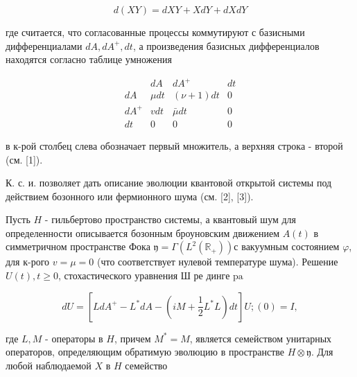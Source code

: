 \documentclass[10pt]{article}
\begin{document}
\[

d(X Y)=d X Y+X d Y+d X d Y

\]



где считается, что согласованные процессы коммутируют с базисными дифференциалами $d A, d A^{+}, d t$, а произведения базисных дифференциалов находятся согласно таблице умножения



\[

\begin{array}{r|ccc} 

& d A & d A^{+} & d t \\

\hline d A & \mu d t & (\nu+1) d t & 0 \\

d A^{+} & v d t & \bar{\mu} d t & 0 \\

d t & 0 & 0 & 0

\end{array}

\]



в к-рой столбец слева обозначает первый множитель, а верхняя строка - второй (см. [1]).



К. с. и. позволяет дать описание эволюции квантовой открытой системы под действием бозонного или фермионного шума (см. [2], [3]).



Пусть $H$ - гильбертово пространство системы, а квантовый шум для определенности описывается бозонным броуновским движением $A(t)$ в симметричном пространстве Фока $\mathfrak{y}=\Gamma\left(L^{2}\left(\mathbb{R}_{+}\right)\right)$с вакуумным состоянием $\varphi$, для к-рого $v=\mu=0$ (что соответствует нулевой температуре шума). Решение $U(t), t \geqslant 0$, стохастического уравнения Ш ре динге $\mathrm{pa}$



\[

d U=\left[L d A^{+}-L^{*} d A-\left(i M+\frac{1}{2} L^{*} L\right) d t\right] U ;(0)=I,

\]



где $L, M$ - операторы в $H$, причем $M^{*}=M$, является семейством унитарных операторов, определяющим обратимую эволюцию в пространстве $H \otimes \mathfrak{y}$. Для любой наблюдаемой $X$ в $H$ семейство
\end{document}
